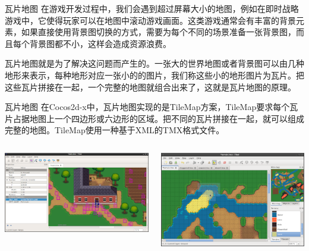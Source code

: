 \documentclass{beamer}
\begin{document}

\begin{frame}[fragile]{瓦片地图}
在游戏开发过程中，我们会遇到超过屏幕大小的地图，例如在即时战略游戏中，它使得玩家可以在地图中滚动游戏画面。这类游戏通常会有丰富的背景元素，如果直接使用背景图切换的方式，需要为每个不同的场景准备一张背景图，而且每个背景图都不小，这样会造成资源浪费。

\vspace{1em}

瓦片地图就是为了解决这问题而产生的。一张大的世界地图或者背景图可以由几种地形来表示，每种地形对应一张小的的图片，我们称这些小的地形图片为瓦片。把这些瓦片拼接在一起，一个完整的地图就组合出来了，这就是瓦片地图的原理。
\end{frame}


\begin{frame}[fragile]{瓦片地图}
在Cocos2d-x中，瓦片地图实现的是TileMap方案，TileMap要求每个瓦片占据地图上一个四边形或六边形的区域。把不同的瓦片拼接在一起，就可以组成完整的地图。TileMap使用一种基于XML的TMX格式文件。

\vspace{1em}

\begin{columns}
\begin{column}{0.5\textwidth}
\includegraphics[width=\textwidth]
{figures/tile_map_1}
\end{column}
\begin{column}{0.5\textwidth}
\includegraphics[width=\textwidth]
{figures/tile_map_2}
\end{column}
\end{columns}
\end{frame}
\end{document}
